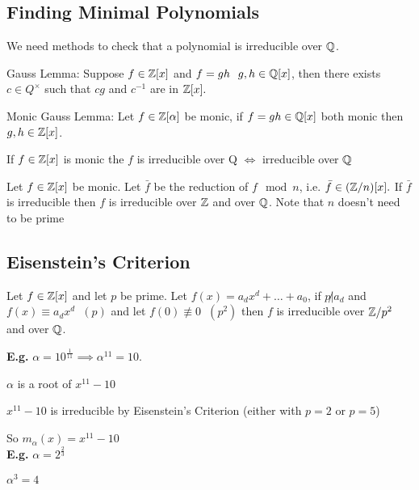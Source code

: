 \documentclass[11pt]{article}
\begin{document}
\subsection{Finding Minimal Polynomials}
We need methods to check that a polynomial is irreducible over $\mathbb{Q}$.

\begin{lemma}
	Gauss Lemma: Suppose $f \in \mathbb{Z}[x]$ and $f=gh \hspace{7pt} g,h \in \mathbb{Q}[x] $, then there exists $c \in Q^\times $ such that $cg$ and $c^{-1} $ are in $\mathbb{Z}[x].$
\end{lemma}

\begin{lemma}
	Monic Gauss Lemma: Let $f \in \mathbb{Z}[\alpha]$ be monic, if $f=gh \in \mathbb{Q}[x]$ both monic then $g,h \in \mathbb{Z}[x]$.
\end{lemma}
\begin{cor}
	If $f \in \mathbb{Z}[x] $ is monic the $f$ is irreducible over Q $\iff $ irreducible over $\mathbb{Q}$
\end{cor}

\begin{cor}
	Let $f \in \mathbb{Z}[x]$ be monic.
	Let $\bar f$ be the reduction of $f \mod n $, i.e. $\bar f \in (\mathbb{Z} / n)[x].$
	If $\bar f$ is irreducible then $f$ is irreducible over $\mathbb{Z}$ and over $\mathbb{Q}$.
	Note that $n$ doesn't need to be prime
\end{cor}


\subsection{Eisenstein's Criterion}
 Let $f \in \mathbb{Z}[x]$ and let $p$ be prime.
Let $f(x) = a_dx^d+ \dots + a_0$, if $p \not | a_d $ and $f(x) \equiv a_dx^d \hspace{7pt} (p)$ and let $ f(0) \not \equiv 0 \hspace{7pt} (p^2) $ then $f $ is irreducible over $\mathbb{Z}/p^2 $ and over $\mathbb{Q}$.

$ $\\
\textbf{E.g.} $\alpha = 10^\frac{1}{11} \implies \alpha^{11} = 10$.


$\alpha $ is a root of $x^{11} - 10$

$x^{11} -10 $ is irreducible by Eisenstein's Criterion (either with $p=2$ or $p=5$)

So $m_\alpha(x) = x^{11}-10 $ 
$ $\\[1em]
\textbf{E.g.} $\alpha = 2^{\frac{2}{3}}$

$\alpha^3 = 4$
\end{document}
